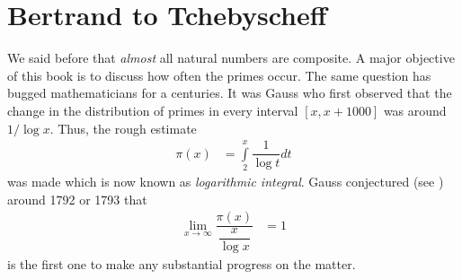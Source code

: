 \documentclass[elemannt.tex]{subfile}
\begin{document}
	\chapter{Bertrand to Tchebyscheff}
	We said before that \textit{almost} all natural numbers are composite. A major objective of this book is to discuss how often the primes occur. The same question has bugged mathematicians for a centuries. It was Gauss who first observed that the change in the distribution of primes in every interval $[x,x+1000]$ was around $1/\log{x}$. Thus, the rough estimate
		\begin{align*}
			\pi(x)
				& = \int\limits_{2}^{x}\dfrac{1}{\log{t}}dt
		\end{align*}
	was made which is now known as \textit{logarithmic integral}. Gauss conjectured (see \textcite[Page 37]{landau_1911}) around 1792 or 1793 that
		\begin{align*}
			\lim\limits_{x\to\infty}\dfrac{\pi(x)}{\dfrac{x}{\log{x}}}
				& = 1
		\end{align*}
	\textcite{tchebycheff_1852} is the first one to make any substantial progress on the matter. %
\end{document}
